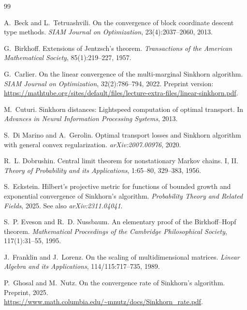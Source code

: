 \documentclass[11pt]{article}
\begin{document}
\begin{thebibliography}{99}

A.~Beck and L.~Tetruashvili.
\newblock On the convergence of block coordinate descent type methods.
\newblock \emph{SIAM Journal on Optimization}, 23(4):2037--2060, 2013.

G.~Birkhoff.
\newblock Extensions of Jentzsch's theorem.
\newblock \emph{Transactions of the American Mathematical Society},
85(1):219--227, 1957.

G.~Carlier.
\newblock On the linear convergence of the multi-marginal Sinkhorn algorithm.
\newblock \emph{SIAM Journal on Optimization}, 32(2):786--794, 2022.
\newblock Preprint version: \url{https://mathtube.org/sites/default/files/lecture-extra-files/linear-sinkhorn.pdf}.

M.~Cuturi.
\newblock Sinkhorn distances: Lightspeed computation of optimal transport.
\newblock In \emph{Advances in Neural Information Processing Systems}, 2013.

S.~Di Marino and A.~Gerolin.
\newblock Optimal transport losses and Sinkhorn algorithm with general convex regularization.
\newblock \emph{arXiv:2007.00976}, 2020.

R.~L. Dobrushin.
\newblock Central limit theorem for nonstationary Markov chains. I, II.
\newblock \emph{Theory of Probability and its Applications}, 1:65--80, 329--383, 1956.

S.~Eckstein.
\newblock Hilbert's projective metric for functions of bounded growth and exponential convergence of Sinkhorn's algorithm.
\newblock \emph{Probability Theory and Related Fields}, 2025.
\newblock See also \emph{arXiv:2311.04041}.

S.~P. Eveson and R.~D. Nussbaum.
\newblock An elementary proof of the Birkhoff--Hopf theorem.
\newblock \emph{Mathematical Proceedings of the Cambridge Philosophical Society}, 117(1):31--55, 1995.

J.~Franklin and J.~Lorenz.
\newblock On the scaling of multidimensional matrices.
\newblock \emph{Linear Algebra and its Applications}, 114/115:717--735, 1989.

P.~Ghosal and M.~Nutz.
\newblock On the convergence rate of Sinkhorn's algorithm.
\newblock Preprint, 2025.
\newblock \url{https://www.math.columbia.edu/~mnutz/docs/Sinkhorn_rate.pdf}.


\end{thebibliography}
\end{document}
